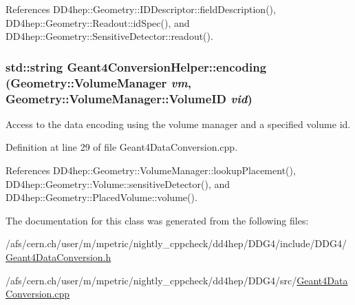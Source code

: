 References DD4hep::Geometry::IDDescriptor::fieldDescription(), DD4hep::Geometry::Readout::idSpec(), and DD4hep::Geometry::SensitiveDetector::readout().\hypertarget{class_d_d4hep_1_1_simulation_1_1_geant4_conversion_helper_a0a26b1a641a6b57ba1d5f92d941e9809}{
\subsubsection[{encoding}]{\setlength{\rightskip}{0pt plus 5cm}std::string Geant4ConversionHelper::encoding ({\bf Geometry::VolumeManager} {\em vm}, \/  {\bf Geometry::VolumeManager::VolumeID} {\em vid})}}
\label{class_d_d4hep_1_1_simulation_1_1_geant4_conversion_helper_a0a26b1a641a6b57ba1d5f92d941e9809}


Access to the data encoding using the volume manager and a specified volume id. 

Definition at line 29 of file Geant4DataConversion.cpp.

References DD4hep::Geometry::VolumeManager::lookupPlacement(), DD4hep::Geometry::Volume::sensitiveDetector(), and DD4hep::Geometry::PlacedVolume::volume().

The documentation for this class was generated from the following files:\begin{DoxyCompactItemize}
\item 
/afs/cern.ch/user/m/mpetric/nightly\_\-cppcheck/dd4hep/DDG4/include/DDG4/\hyperlink{_geant4_data_conversion_8h}{Geant4DataConversion.h}\item 
/afs/cern.ch/user/m/mpetric/nightly\_\-cppcheck/dd4hep/DDG4/src/\hyperlink{_geant4_data_conversion_8cpp}{Geant4DataConversion.cpp}\end{DoxyCompactItemize}
